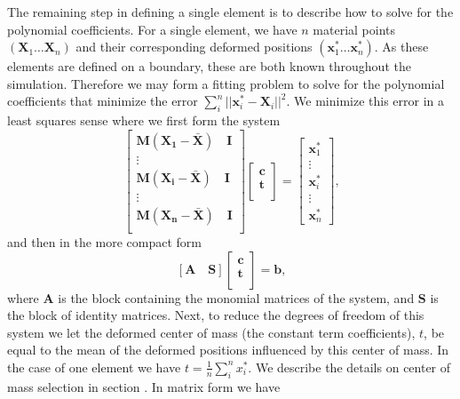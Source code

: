 The remaining step in defining a single element is to describe how to solve for the polynomial coefficients. For a single element, we have $n$ material points $(\mathbf{X}_1 \dots \mathbf{X}_n)$ and their corresponding deformed positions $(\mathbf{x}^*_1 \dots \mathbf{x}^*_n)$. As these elements are defined on a boundary, these are both known throughout the simulation. Therefore we may form a fitting problem to solve for the polynomial coefficients that minimize the error $\sum_i^n ||\mathbf{x}_i^* - \mathbf{X}_i ||^2$.  We minimize this error in a least squares sense where we first form the system
\begin{equation}
\left[\begin{array}{c}
\mathbf{M}(\mathbf{X_1-\bar{X}}) \quad \mathbf{I} \\
\vdots \\
\mathbf{M}(\mathbf{X_i-\bar{X}}) \quad \mathbf{I} \\
\vdots \\
\mathbf{M}(\mathbf{X_n-\bar{X}}) \quad \mathbf{I} \\
\end{array} \right]
\left[ \begin{array}{c}
\mathbf{c} \\
\mathbf{t} \\
\end{array} \right] = 
\left[ \begin{array}{c}
\mathbf{x}_1^* \\
\vdots \\
\mathbf{x}_i^* \\
\vdots \\
\mathbf{x}_n^*
\end{array} \right]
\text{,}
\end{equation}
and then in the more compact form
\begin{equation}
\left[
\mathbf{A} \quad \mathbf{S}
\right]
\left[ \begin{array}{c}
\mathbf{c} \\
\mathbf{t} \\
\end{array} \right] = \mathbf{b}
\text{,}
\end{equation}
where $\mathbf{A}$ is the block containing the monomial matrices of the system, and $\mathbf{S}$ is the block of identity matrices. Next, to reduce the degrees of freedom of this system we let the deformed center of mass (the constant term coefficients), $t$, be equal to the mean of the deformed positions influenced by this center of mass. In the case of one element we have $t = \frac{1}{n}\sum_i^n x_i^*$. We describe the details on center of mass selection in section . In matrix form we have
